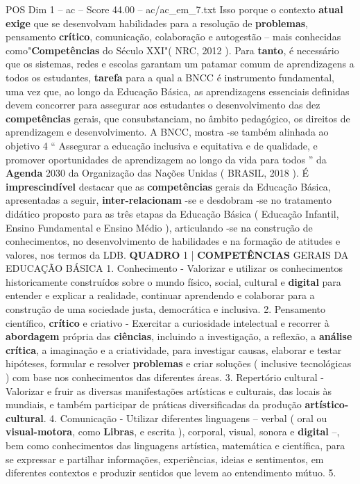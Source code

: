 \begin{textsample}{POS Dim 1 – ac – Score 44.00 – ac/ac\_em\_7.txt}
Isso porque o contexto \textbf{atual} \textbf{exige} que se desenvolvam habilidades para a resolução de \textbf{problemas}, pensamento \textbf{crítico}, comunicação, colaboração e autogestão – mais conhecidas como"\textbf{Competências} do Século XXI"( NRC, 2012 ).
Para \textbf{tanto}, é necessário que os sistemas, redes e escolas garantam um patamar comum de aprendizagens a todos os estudantes, \textbf{tarefa} para a qual a BNCC é instrumento fundamental, uma vez que, ao longo da Educação Básica, as aprendizagens essenciais definidas devem concorrer para assegurar aos estudantes o desenvolvimento das dez \textbf{competências} gerais, que consubstanciam, no âmbito pedagógico, os direitos de aprendizagem e desenvolvimento.
A BNCC, mostra -se também alinhada ao objetivo 4 “ Assegurar a educação inclusiva e equitativa e de qualidade, e promover oportunidades de aprendizagem ao longo da vida para todos ” da \textbf{Agenda} 2030 da Organização das Nações Unidas ( BRASIL, 2018 ).
É \textbf{imprescindível} destacar que as \textbf{competências} gerais da Educação Básica, apresentadas a seguir, \textbf{inter-relacionam} -se e desdobram -se no tratamento didático proposto para as três etapas da Educação Básica ( Educação Infantil, Ensino Fundamental e Ensino Médio ), articulando -se na construção de conhecimentos, no desenvolvimento de habilidades e na formação de atitudes e valores, nos termos da LDB. \textbf{QUADRO} 1 | \textbf{COMPETÊNCIAS} GERAIS DA EDUCAÇÃO BÁSICA 1.
Conhecimento - Valorizar e utilizar os conhecimentos historicamente construídos sobre o mundo físico, social, cultural e \textbf{digital} para entender e explicar a realidade, continuar aprendendo e colaborar para a construção de uma sociedade justa, democrática e inclusiva. 2.
Pensamento científico, \textbf{crítico} e criativo - Exercitar a curiosidade intelectual e recorrer à \textbf{abordagem} própria das \textbf{ciências}, incluindo a investigação, a reflexão, a \textbf{análise} \textbf{crítica}, a imaginação e a criatividade, para investigar causas, elaborar e testar hipóteses, formular e resolver \textbf{problemas} e criar soluções ( inclusive tecnológicas ) com base nos conhecimentos das diferentes áreas. 3.
Repertório cultural - Valorizar e fruir as diversas manifestações artísticas e culturais, das locais às mundiais, e também participar de práticas diversificadas da produção \textbf{artístico-cultural}. 4.
Comunicação - Utilizar diferentes linguagens – verbal ( oral ou \textbf{visual-motora}, como \textbf{Libras}, e escrita ), corporal, visual, sonora e \textbf{digital} –, bem como conhecimentos das linguagens artística, matemática e científica, para se expressar e partilhar informações, experiências, ideias e sentimentos, em diferentes contextos e produzir sentidos que levem ao entendimento mútuo. 5.

\end{textsample}
